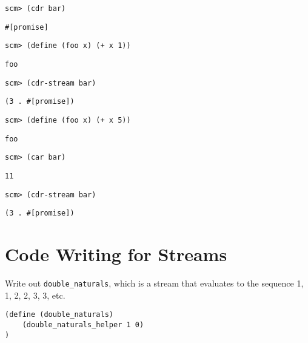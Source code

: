 \documentclass{exam}
\begin{document}
\begin{questions}
\begin{blocksection}
\begin{lstlisting}
scm> (cdr bar)
\end{lstlisting}
\begin{solution}[.5in]
\begin{lstlisting}
#[promise]
\end{lstlisting}
\end{solution}

\begin{lstlisting}
scm> (define (foo x) (+ x 1))
\end{lstlisting}
\begin{solution}[.5in]
\texttt{foo}
\end{solution}

\begin{lstlisting}
scm> (cdr-stream bar)
\end{lstlisting}
\begin{solution}[.5in]
\begin{lstlisting}
(3 . #[promise])
\end{lstlisting}
\end{solution}

\begin{lstlisting}
scm> (define (foo x) (+ x 5))
\end{lstlisting}
\begin{solution}[.5in]
\texttt{foo}
\end{solution}

\begin{lstlisting}
scm> (car bar)
\end{lstlisting}
\begin{solution}[.5in]
\texttt{11}
\end{solution}

\begin{lstlisting}
scm> (cdr-stream bar)
\end{lstlisting}
\begin{solution}[.5in]
\begin{lstlisting}
(3 . #[promise])
\end{lstlisting}
\end{solution}

\end{blocksection}

\section{Code Writing for Streams}

\begin{blocksection}
\question Write out \texttt{double\_naturals}, which is a stream that evaluates to the sequence 1, 1, 2, 2, 3, 3, etc.
\begin{lstlisting}
(define (double_naturals)
    (double_naturals_helper 1 0)
)


\end{lstlisting}
\end{blocksection}
\end{questions}
\end{document}
